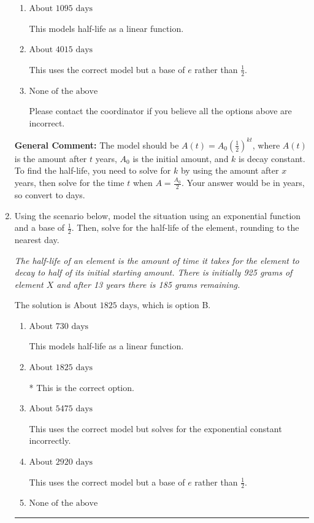 \documentclass{extbook}[14pt]
\newcommand{\litem}[1]{\item #1

\rule{\textwidth}{0.4pt}}
\begin{document}
\begin{enumerate}
{\begin{enumerate}[label=\Alph*.]
This uses the correct model but solves for the exponential constant incorrectly.
\item \( \text{About } 1095 \text{ days} \)

This models half-life as a linear function.
\item \( \text{About } 4015 \text{ days} \)

This uses the correct model but a base of $e$ rather than $\frac{1}{2}$.
\item \( \text{None of the above} \)

Please contact the coordinator if you believe all the options above are incorrect.
\end{enumerate}

\textbf{General Comment:} The model should be $A(t) = A_0 (\frac{1}{2})^{kt}$, where $A(t)$ is the amount after $t$ years, $A_0$ is the initial amount, and $k$ is decay constant. To find the half-life, you need to solve for $k$ by using the amount after $x$ years, then solve for the time $t$ when $A = \frac{A_0}{2}$. Your answer would be in years, so convert to days.
}
\litem{
Using the scenario below, model the situation using an exponential function and a base of $\frac{1}{2}$. Then, solve for the half-life of the element, rounding to the nearest day.

\begin{center}
    \textit{ The half-life of an element is the amount of time it takes for the element to decay to half of its initial starting amount. There is initially 925 grams of element $X$ and after 13 years there is 185 grams remaining. }
\end{center}


The solution is \( \text{About } 1825 \text{ days} \), which is option B.\begin{enumerate}[label=\Alph*.]
\item \( \text{About } 730 \text{ days} \)

This models half-life as a linear function.
\item \( \text{About } 1825 \text{ days} \)

* This is the correct option.
\item \( \text{About } 5475 \text{ days} \)

This uses the correct model but solves for the exponential constant incorrectly.
\item \( \text{About } 2920 \text{ days} \)

This uses the correct model but a base of $e$ rather than $\frac{1}{2}$.
\item \( \text{None of the above} \)


\end{enumerate}}
\end{enumerate}
\end{document}
